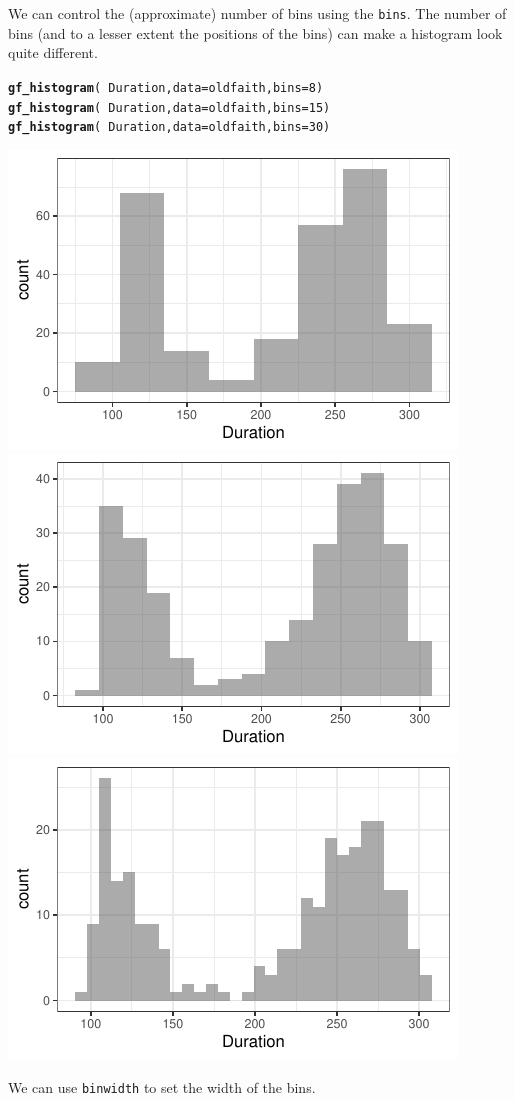 \documentclass[twoside]{book}\usepackage[]{graphicx}\usepackage[]{xcolor}
\makeatletter
\newcommand{\hlnum}[1]{\textcolor[rgb]{0.686,0.059,0.569}{#1}}%
\newcommand{\hlopt}[1]{\textcolor[rgb]{0,0,0}{#1}}%
\newcommand{\hlstd}[1]{\textcolor[rgb]{0.345,0.345,0.345}{#1}}%
\newcommand{\hlkwc}[1]{\textcolor[rgb]{0.333,0.667,0.333}{#1}}%
\newcommand{\hlkwd}[1]{\textcolor[rgb]{0.737,0.353,0.396}{\textbf{#1}}}%
\newenvironment{kframe}{%
 \def\at@end@of@kframe{}%
 \ifinner\ifhmode%
  \def\at@end@of@kframe{\end{minipage}}%
  \begin{minipage}{\columnwidth}%
 \fi\fi%
 \def\FrameCommand##1{\hskip\@totalleftmargin \hskip-\fboxsep
 \colorbox{shadecolor}{##1}\hskip-\fboxsep
     \hskip-\linewidth \hskip-\@totalleftmargin \hskip\columnwidth}%
 \MakeFramed {\advance\hsize-\width
   \@totalleftmargin\z@ \linewidth\hsize
   \@setminipage}}%
 {\par\unskip\endMakeFramed%
 \at@end@of@kframe}
\newenvironment{knitrout}{}{} %
\newcommand{\option}[1]{{\color{brown!80!black}\texttt{#1}}}
\makeatother
\begin{document}
We can control the (approximate) number of bins using the \option{bins}.
The number of bins (and to a lesser extent the positions of the bins)
can make a histogram look quite different.
\begin{knitrout}
\color{fgcolor}\begin{kframe}
\begin{alltt}
\hlkwd{gf_histogram}\hlstd{(} \hlopt{~} \hlstd{Duration,} \hlkwc{data} \hlstd{= oldfaith,} \hlkwc{bins} \hlstd{=} \hlnum{8} \hlstd{)}
\hlkwd{gf_histogram}\hlstd{(} \hlopt{~} \hlstd{Duration,} \hlkwc{data} \hlstd{= oldfaith,} \hlkwc{bins} \hlstd{=} \hlnum{15} \hlstd{)}
\hlkwd{gf_histogram}\hlstd{(} \hlopt{~} \hlstd{Duration,} \hlkwc{data} \hlstd{= oldfaith,} \hlkwc{bins} \hlstd{=} \hlnum{30} \hlstd{)}
\end{alltt}
\end{kframe}

{\centering \includegraphics[width=.3\textwidth]{figures/fig-histogram2-1} 
\includegraphics[width=.3\textwidth]{figures/fig-histogram2-2} 
\includegraphics[width=.3\textwidth]{figures/fig-histogram2-3} 

}



\end{knitrout}


We can use \option{binwidth} to set the width of the bins.
\end{document}
